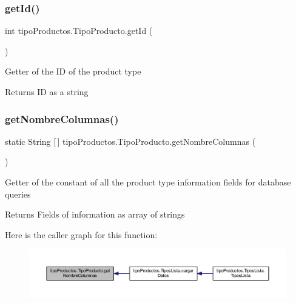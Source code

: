 \subsubsection{\texorpdfstring{get\+Id()}{getId()}}
{\footnotesize\ttfamily int tipo\+Productos.\+Tipo\+Producto.\+get\+Id (\begin{DoxyParamCaption}{ }\end{DoxyParamCaption})}

Getter of the ID of the product type

\begin{DoxyReturn}{Returns}
ID as a string 
\end{DoxyReturn}
\mbox{\label{classtipo_productos_1_1_tipo_producto_a09ad6d5a9a33a7822d51ad9134aa670e}} 
\subsubsection{\texorpdfstring{get\+Nombre\+Columnas()}{getNombreColumnas()}}
{\footnotesize\ttfamily static String \mbox{[}$\,$\mbox{]} tipo\+Productos.\+Tipo\+Producto.\+get\+Nombre\+Columnas (\begin{DoxyParamCaption}{ }\end{DoxyParamCaption})\hspace{0.3cm}{\ttfamily [static]}}

Getter of the constant of all the product type information fields for database queries

\begin{DoxyReturn}{Returns}
Fields of information as array of strings 
\end{DoxyReturn}
Here is the caller graph for this function\+:
\nopagebreak
\begin{figure}[H]
\begin{center}
\leavevmode
\includegraphics[width=350pt]{classtipo_productos_1_1_tipo_producto_a09ad6d5a9a33a7822d51ad9134aa670e_icgraph}
\end{center}
\end{figure}
\mbox{\label{classtipo_productos_1_1_tipo_producto_a9202294408afa6fde0a50eb4ac09c7de}} 
